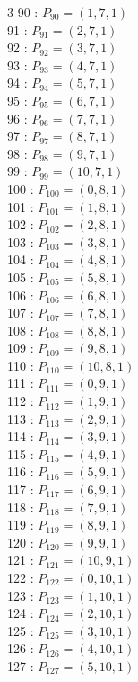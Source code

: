 \documentclass{article}
\begin{document}
{\begin{multicols}{3}
90 : $P_{90}=( 1, 7, 1 )$\\
91 : $P_{91}=( 2, 7, 1 )$\\
92 : $P_{92}=( 3, 7, 1 )$\\
93 : $P_{93}=( 4, 7, 1 )$\\
94 : $P_{94}=( 5, 7, 1 )$\\
95 : $P_{95}=( 6, 7, 1 )$\\
96 : $P_{96}=( 7, 7, 1 )$\\
97 : $P_{97}=( 8, 7, 1 )$\\
98 : $P_{98}=( 9, 7, 1 )$\\
99 : $P_{99}=( 10, 7, 1 )$\\
100 : $P_{100}=( 0, 8, 1 )$\\
101 : $P_{101}=( 1, 8, 1 )$\\
102 : $P_{102}=( 2, 8, 1 )$\\
103 : $P_{103}=( 3, 8, 1 )$\\
104 : $P_{104}=( 4, 8, 1 )$\\
105 : $P_{105}=( 5, 8, 1 )$\\
106 : $P_{106}=( 6, 8, 1 )$\\
107 : $P_{107}=( 7, 8, 1 )$\\
108 : $P_{108}=( 8, 8, 1 )$\\
109 : $P_{109}=( 9, 8, 1 )$\\
110 : $P_{110}=( 10, 8, 1 )$\\
111 : $P_{111}=( 0, 9, 1 )$\\
112 : $P_{112}=( 1, 9, 1 )$\\
113 : $P_{113}=( 2, 9, 1 )$\\
114 : $P_{114}=( 3, 9, 1 )$\\
115 : $P_{115}=( 4, 9, 1 )$\\
116 : $P_{116}=( 5, 9, 1 )$\\
117 : $P_{117}=( 6, 9, 1 )$\\
118 : $P_{118}=( 7, 9, 1 )$\\
119 : $P_{119}=( 8, 9, 1 )$\\
120 : $P_{120}=( 9, 9, 1 )$\\
121 : $P_{121}=( 10, 9, 1 )$\\
122 : $P_{122}=( 0, 10, 1 )$\\
123 : $P_{123}=( 1, 10, 1 )$\\
124 : $P_{124}=( 2, 10, 1 )$\\
125 : $P_{125}=( 3, 10, 1 )$\\
126 : $P_{126}=( 4, 10, 1 )$\\
127 : $P_{127}=( 5, 10, 1 )$\\

\end{multicols}}
\end{document}
